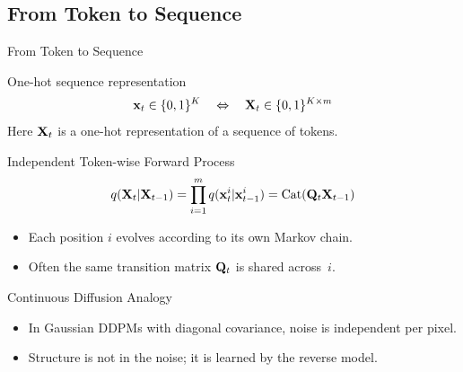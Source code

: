 \documentclass{beamer}
\begin{document}
\subsection{From Token to Sequence}
\begin{frame}{From Token to Sequence}
    \begin{block}{One-hot sequence representation}
        \vspace{-0.3cm}
        \[
            \mathbf{x}_t \in \{0,1\}^K
            \quad\Leftrightarrow\quad
            \mathbf{X}_t \in \{0,1\}^{K \times m}
        \]
        \vspace{-0.2cm}
        Here $\mathbf{X}_t$ is a one-hot representation of a sequence of tokens.
    \end{block}
    \eqpause
    \begin{block}{Independent Token-wise Forward Process}
        \vspace{-0.3cm}
        \[
            q(\mathbf{X}_t |\mathbf{X}_{t-1}) =
            \prod_{i=1}^m q(\mathbf{x}_t^i |\mathbf{x}_{t-1}^i) = \operatorname{Cat}(\mathbf{Q}_t \mathbf{X}_{t-1})
        \]
        \vspace{-0.3cm}
        \begin{itemize}
            \item Each position $i$ evolves according to its own Markov chain.
            \item Often the same transition matrix $\mathbf{Q}_t$ is shared across~$i$.
        \end{itemize}
    \end{block}
    \eqpause
    \begin{block}{Continuous Diffusion Analogy}
        \begin{itemize}
            \item In Gaussian DDPMs with diagonal covariance, noise is independent per pixel.
            \item Structure is not in the noise; it is learned by the reverse model.
        \end{itemize}
    \end{block}
\end{frame}
\end{document}
